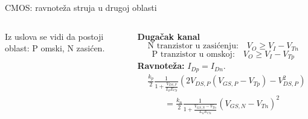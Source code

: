 \begin{frame}[label=09_2-s026]{CMOS: ravnoteža struja u drugoj oblasti}
\begin{columns}[T,onlytextwidth]\centering {}Iz uslova se vidi da postoji oblast: P omski, N zasićen.\par\medskip\textbf{Dugačak kanal}\[\text{N tranzistor u zasićenju:}\quad V_O\ge V_I-V_{Tn}\]
\[\text{P tranzistor u omskoj:}\quad V_O\ge V_I-V_{Tp}\]
\textbf{Ravnoteža:} $I_{Dp}=I_{Dn}$.\[\begin{aligned}&\frac{k_p}2\frac1{1+\frac{V_{DS,P}}{L_pE_{Cp}}}\left(2V_{DS,P}(V_{GS,P}-V_{Tp})-V_{DS,P}^2\right)\\&\qquad=\frac{k_n}2\frac1{1+\frac{V_{GS,N}-V_{Tn}}{L_nE_{Cn}}}(V_{GS,N}-V_{Tn})^2\end{aligned}\]
\end{columns}
\end{frame}
